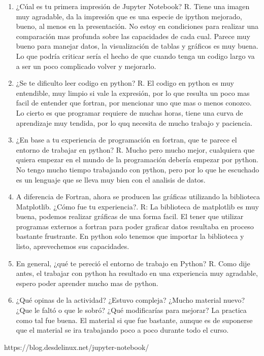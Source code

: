 \documentclass[12pt,a4paper]{article}
\begin{document}
\begin{enumerate}
\item ¿Cúal es tu primera impresión de Jupyter Notebook?
R. Tiene una imagen muy agradable, da la impresión que es una especie de ipython mejorado, bueno, al menos en la presentación. No estoy en condiciones para realizar una comparación mas profunda sobre las capacidades de cada cual. Parece muy bueno para manejar datos, la visualización de tablas y gráficos es muy buena. Lo que podría criticar sería el hecho de que cuando tenga un codigo largo va a ser un poco complicado volver y mejorarlo.

\item ¿Se te dificulto leer codigo en python?
R. El codigo en python es muy entendible, muy limpio si vale la expresión, por lo que resulta un poco mas facil de entender que fortran, por mencionar uno que mas o menos conozco. Lo cierto es que programar requiere de muchas horas, tiene una curva de aprendizaje muy tendida, por lo quq necesita de mucho trabajo y paciencia.

\item ¿En base a tu experiencia de programación en fortran, que te parece el entorno de trabajar en python?
R. Mucho pero mucho mejor, cualquiera que quiera empezar en el mundo de la programación debería empezar por python. No tengo mucho tiempo trabajando con python, pero por lo que he escuchado es un lenguaje que se lleva muy bien con el analisis de datos.

\item A diferencia de Fortran, ahora se producen las gráficas utilizando la biblioteca Matplotlib. ¿Cómo fue tu experiencia?.
R: La biblioteca de matplotlib es muy buena, podemos realizar gráficas de una forma facil. El tener que utilizar programas externos a fortran para poder graficar datos resultaba en proceso bastante frustrante. En python solo tenemos que importar la biblioteca y listo, aprevechemos sus capacidades.

\item En general, ¿qué te pereció el entorno de trabajo en Python?
R. Como dije antes, el trabajar con python ha resultado en una experiencia muy agradable, espero poder aprender mucho mas de python.

\item ¿Qué opinas de la actividad? ¿Estuvo compleja? ¿Mucho material nuevo? ¿Que le faltó o que le sobró? ¿Qué modificarías para mejorar? La practica como tal fue buena. El material si que fue bastante, aunque es de suponerse que el material se ira trabajando poco a poco durante todo el curso.

\end{enumerate}





\begin{thebibliography}{0}


https://blog.desdelinux.net/jupyter-notebook/

\end{thebibliography}
\end{document}
